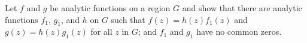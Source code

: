 
Let $f$ and $g$ be analytic functions on a region $G$ and show that there are analytic functions $f_1$, $g_1$, and $h$ on $G$ such that $f(z) = h(z)f_1(z)$ and $g(z) = h(z)g_1(z)$ for all $z$ in $G$; and $f_1$ and $g_1$ have no common zeros.
